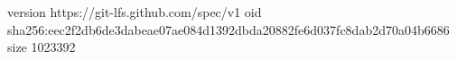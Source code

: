 version https://git-lfs.github.com/spec/v1
oid sha256:eec2f2db6de3dabeae07ae084d1392dbda20882fe6d037fc8dab2d70a04b6686
size 1023392
